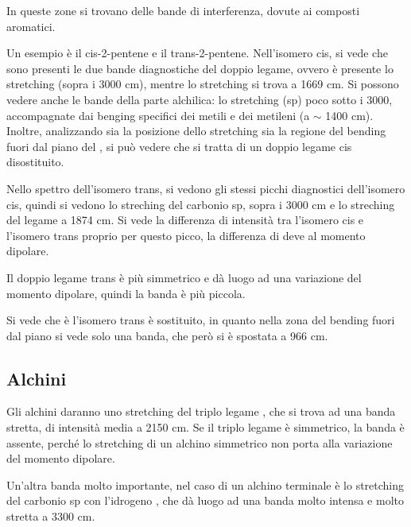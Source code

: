 In queste zone si trovano delle bande di interferenza, dovute ai
composti aromatici.


Un esempio è il cis-2-pentene e il trans-2-pentene. Nell'isomero cis, si
vede che sono presenti le due bande diagnostiche del doppio legame,
ovvero è presente lo stretching  (sopra i 3000 cm), mentre lo
stretching  si trova a 1669 cm. Si possono vedere anche le bande
della parte alchilica: lo stretching  (sp) poco sotto i 3000,
accompagnate dai benging specifici dei metili e dei metileni (a \(\sim\)
1400 cm). Inoltre, analizzando sia la posizione dello stretching 
sia la regione del bending fuori dal piano del , si può vedere che si
tratta di un doppio legame cis disostituito.

Nello spettro dell'isomero trans, si vedono gli stessi picchi
diagnostici dell'isomero cis, quindi si vedono lo streching del carbonio
sp, sopra i 3000 cm e lo streching del legame  a 1874 cm. Si
vede la differenza di intensità tra l'isomero cis e l'isomero trans
proprio per questo picco, la differenza di deve al momento dipolare.

Il doppio legame trans è più simmetrico e dà luogo ad una variazione del
momento dipolare, quindi la banda è più piccola.

Si vede che è l'isomero trans è sostituito, in quanto nella zona del
bending fuori dal piano si vede solo una banda, che però si è spostata a
966 cm.

\subsection{Alchini}

Gli alchini daranno uno stretching del triplo legame , che si
trova ad una banda stretta, di intensità media a 2150 cm. Se il triplo
legame è simmetrico, la banda è assente, perché lo stretching di un
alchino simmetrico non porta alla variazione del momento dipolare.

Un'altra banda molto importante, nel caso di un alchino terminale è lo
stretching del carbonio sp con l'idrogeno , che dà luogo ad una banda
molto intensa e molto stretta a 3300 cm.


